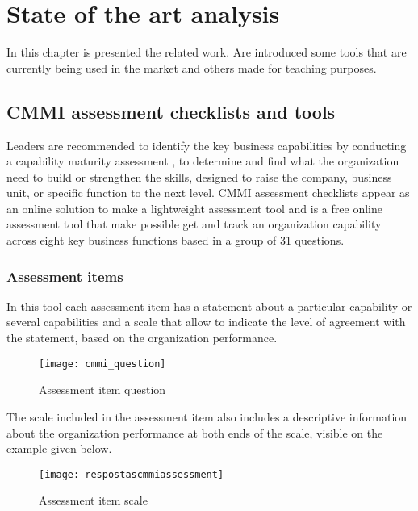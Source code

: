 \chapter{State of the art analysis}\label{chap:chap3}

In this chapter is presented the related work. Are introduced  some tools that are currently being used in the market and others made for teaching purposes.

\section{CMMI assessment checklists and tools}
Leaders are recommended to identify the key business capabilities  by conducting a capability maturity assessment \citep{Hutchinson2014}, to determine and find what the organization need to build or strengthen the skills, designed to raise the company, business unit, or specific function to the next level. CMMI assessment checklists appear as an online solution to make a lightweight assessment tool and is a free online assessment tool that make possible get and track an organization capability across eight key business functions based in a group of 31 questions.


\subsection{Assessment items}
In this tool each assessment item has a statement about a particular capability or several capabilities and a scale that allow to indicate the level of agreement with the statement, based on the organization performance. 

\begin{figure}[h]
	\begin{center}
		\leavevmode
		\texttt{[image: cmmi\_question]}
		\caption{Assessment item question}
		\label{fig:cmmi_question}
	\end{center}
\end{figure}

The scale included in the assessment item also includes a descriptive information about the organization performance at both ends of the scale, visible on the example given below.

\begin{figure}[h]
	\begin{center}
		\leavevmode
		\texttt{[image: respostascmmiassessment]}
		\caption{Assessment item scale}
		\label{fig:assesment_answer}
	\end{center}
\end{figure}

